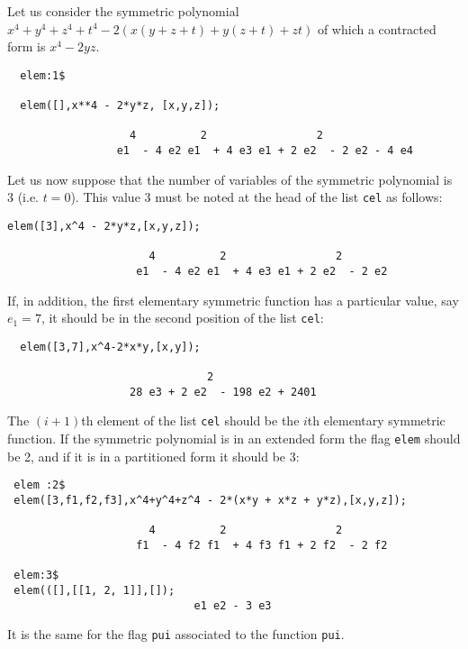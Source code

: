 \documentclass[11pt]{article}
\begin{document}
Let us consider the symmetric polynomial $x^4+y^4+z^4+t^4 - 2(x(y+z+t) + y(z+t)
+ z t)$ of which a contracted form is $x^4 -2 y z$.
\small
\begin{verbatim}
  elem:1$

  elem([],x**4 - 2*y*z, [x,y,z]); 

                   4          2                 2
                 e1  - 4 e2 e1  + 4 e3 e1 + 2 e2  - 2 e2 - 4 e4
\end{verbatim}
\normalsize
Let us now suppose that the number of variables of the symmetric polynomial is 3
(i.e. $t=0$). This value 3 must be noted at the head of the list \texttt{cel} as
follows:
\small
\begin{verbatim}
elem([3],x^4 - 2*y*z,[x,y,z]);

                      4          2                 2
                    e1  - 4 e2 e1  + 4 e3 e1 + 2 e2  - 2 e2
\end{verbatim}
\normalsize
If, in addition, the first elementary symmetric function has a particular value,
say $e_1=7$, it should be in the second position of the list \texttt{cel}:
\small
\begin{verbatim}
  elem([3,7],x^4-2*x*y,[x,y]);

                               2
                   28 e3 + 2 e2  - 198 e2 + 2401
\end{verbatim}
\normalsize
The $(i+1)$th element of the list \texttt{cel} should be the $i$th elementary
symmetric function.  If the symmetric polynomial is in an extended form the flag
\texttt{elem} should be 2, and if it is in a partitioned form it should be 3:
\small
\begin{verbatim}
 elem :2$
 elem([3,f1,f2,f3],x^4+y^4+z^4 - 2*(x*y + x*z + y*z),[x,y,z]);

                      4          2                 2
                    f1  - 4 f2 f1  + 4 f3 f1 + 2 f2  - 2 f2

 elem:3$
 elem(([],[[1, 2, 1]],[]);
                             e1 e2 - 3 e3
\end{verbatim}
\normalsize
It is the same for the flag \texttt{pui} associated to the function \texttt{pui}.
\end{document}
